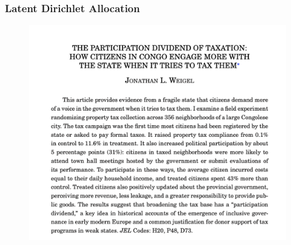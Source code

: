 \documentclass[
  shownotes,
  xcolor={svgnames},
  hyperref={colorlinks,citecolor=DarkBlue,linkcolor=DarkRed,urlcolor=DarkBlue}
  , aspectratio=169]{beamer}
\begin{document}
\begin{frame}
\frametitle{Latent Dirichlet Allocation}

\begin{figure}[H] \centering
            \captionsetup{justification=centering}
              \includegraphics[scale=0.4]{figures/weigel1.png}
              
 \end{figure}

 \end{frame}
\end{document}
